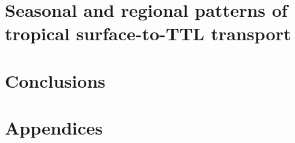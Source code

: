\documentclass[12pt,a4paper,twoside]{report}
\begin{document}
\chapter{Seasonal and regional patterns of tropical surface-to-TTL transport}
\label{ch:chapter6}




\chapter{Conclusions}
\label{ch:chapter7}



\newpage
\clearpage




%  

\appendix
\renewcommand{\theequation}{A-\arabic{equation}}
\setcounter{equation}{0}  %
\renewcommand{\thefigure}{A-\arabic{figure}}
\setcounter{figure}{0}    %

\chapter*{Appendices}  
\fancyhead[RE]{\textit{\leftmark}}
\fancyhead[LO]{\textit{\leftmark}}

\end{document}
